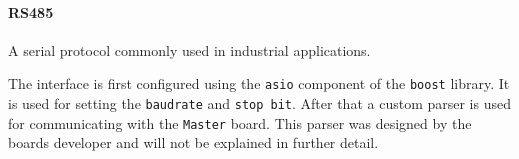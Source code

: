 \paragraph{RS485}
A serial protocol commonly used in industrial applications.

The interface is first configured using the \verb|asio| component of the \verb|boost| library.
It is used for setting the \verb|baudrate| and \verb|stop bit|.
After that a custom parser is used for communicating with the \verb|Master| board.
This parser was designed by the boards developer and will not be explained in further detail.

